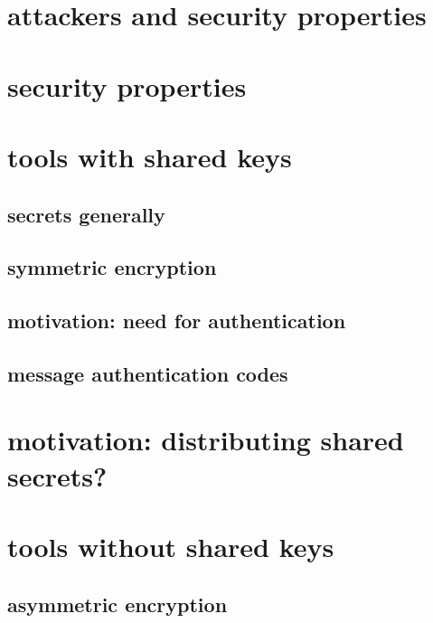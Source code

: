 
\section{attackers and security properties}


\section{security properties}


\section{tools with shared keys}

\subsection{secrets generally}


\subsection{symmetric encryption}


\subsection{motivation: need for authentication}


\subsection{message authentication codes}


\section{motivation: distributing shared secrets?}


\section{tools without shared keys}

\subsection{asymmetric encryption}

